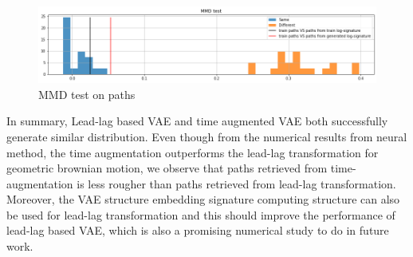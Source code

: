 \documentclass[12pt]{report}
\theoremstyle{definition}
\theoremstyle{remark}
\begin{document}
\begin{figure}[H]
    \centering
    \includegraphics[width=\textwidth]{figs/cvae25.png}
    \caption{MMD test on paths}
\end{figure}
In summary, Lead-lag based VAE and time augmented VAE both successfully generate similar distribution. Even though from the numerical results from neural method, the time augmentation outperforms the lead-lag transformation for geometric brownian motion, we observe that paths retrieved from time-augmentation is less rougher than paths retrieved from lead-lag transformation. Moreover, the VAE structure embedding signature computing structure can also be used for lead-lag transformation and this should improve the performance of lead-lag based VAE, which is also a promising numerical study to do in future work. 
\end{document}
